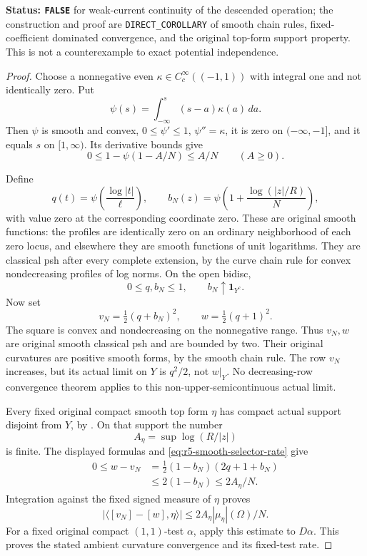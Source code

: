 \documentclass[11pt,a4paper]{article}
\numberwithin{equation}{section}
\theoremstyle{definition}
\theoremstyle{remark}
\begin{document}
\noindent\textbf{Status: \texttt{FALSE}} for weak-current
continuity of the descended operation; the construction and
proof are \texttt{DIRECT\_COROLLARY} of smooth chain rules,
fixed-coefficient dominated convergence, and the original
top-form support property. This is not a counterexample to
exact potential independence.

\begin{proof}
Choose a nonnegative even $\kappa\in C_c^\infty((-1,1))$
with integral one and not identically zero. Put
\[
       \psi(s)=\int_{-\infty}^s(s-a)\kappa(a)\,da.
\]
Then $\psi$ is smooth and convex, $0\leq\psi'\leq1$,
$\psi''=\kappa$, it is zero on $(-\infty,-1]$, and
it equals $s$ on $[1,\infty)$. Its derivative bounds give
\begin{equation}
 0\leq 1-\psi(1-A/N)\leq A/N\qquad(A\geq0).
 \label{eq:r5-smooth-selector-rate}
\end{equation}

Define
\[
 q(t)=\psi\!\left(\frac{\log|t|}{\ell}\right),
 \qquad
 b_N(z)=\psi\!\left(1+\frac{\log(|z|/R)}{N}\right),
\]
with value zero at the corresponding coordinate zero.
These are original smooth functions: the profiles are
identically zero on an ordinary neighborhood of each zero
locus, and elsewhere they are smooth functions of unit
logarithms. They are classical psh after every complete
extension, by the curve chain rule for convex nondecreasing
profiles of log norms. On the open bidisc,
\[
           0\leq q,b_N\leq1,
       \qquad b_N\uparrow\mathbf1_{Y^c}.
\]
Now set
\[
             v_N=\tfrac12(q+b_N)^2,
          \qquad w=\tfrac12(q+1)^2.
\]
The square is convex and nondecreasing on the nonnegative
range. Thus $v_N,w$ are original smooth classical psh and
are bounded by two. Their original curvatures are positive
smooth forms, by the smooth chain rule. The row $v_N$
increases, but its actual limit on $Y$ is $q^2/2$, not
$w|_Y$. No decreasing-row convergence theorem applies to
this non-upper-semicontinuous actual limit.

Every fixed original compact smooth top form $\eta$ has
compact actual support disjoint from $Y$, by
\cite[Proposition 15.2.1]{CLD25}. On that support the number
\[
                 A_\eta=\sup\log(R/|z|)
\]
is finite. The displayed formulas and
\eqref{eq:r5-smooth-selector-rate} give
\[
 \begin{aligned}
 0\leq w-v_N
  &=\tfrac12(1-b_N)(2q+1+b_N)\\
  &\leq2(1-b_N)\leq 2A_\eta/N.
 \end{aligned}
\]
Integration against the fixed signed measure of $\eta$
proves
\[
 |\langle[v_N]-[w],\eta\rangle|
       \leq 2A_\eta|\mu_\eta|(\Omega)/N.
\]
For a fixed original compact $(1,1)$-test $\alpha$, apply
this estimate to $D\alpha$. This proves the stated ambient
curvature convergence and its fixed-test rate.


\end{proof}
\end{document}
